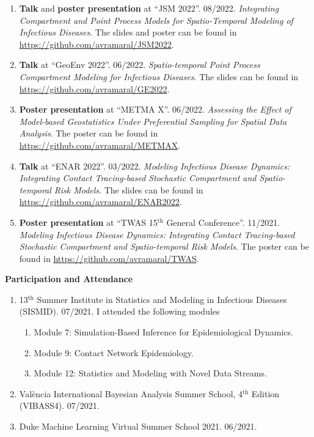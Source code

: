 \documentclass[11pt, ]{article}
\begin{document}
	\begin{enumerate}
		\item \textbf{Talk} and \textbf{poster presentation} at ``JSM 2022''. 08/2022. \textit{Integrating Compartment and Point Process Models for Spatio-Temporal Modeling of Infectious Diseases}. The slides and poster can be found in \href{https://github.com/avramaral/JSM2022}{https://github.com/avramaral/JSM2022}.
		
		\item \textbf{Talk} at ``GeoEnv 2022''. 06/2022. \textit{Spatio-temporal Point Process Compartment Modeling for Infectious Diseases}. The slides can be found in \href{https://github.com/avramaral/GE2022}{https://github.com/avramaral/GE2022}.
		
		\item \textbf{Poster presentation} at ``METMA X''. 06/2022. \textit{Assessing the Effect of Model-based Geostatistics Under Preferential Sampling for Spatial Data Analysis}. The poster can be found in \href{https://github.com/avramaral/METMAX}{https://github.com/avramaral/METMAX}.
		
		\item \textbf{Talk} at ``ENAR 2022''. 03/2022. \textit{Modeling Infectious Disease Dynamics: Integrating Contact Tracing-based	Stochastic Compartment and Spatio-temporal Risk Models}. The slides can be found in \href{https://github.com/avramaral/ENAR2022}{https://github.com/avramaral/ENAR2022}.
		
		\item \textbf{Poster presentation} at ``TWAS 15${}^{\text{th}}$ General Conference''. 11/2021. \textit{Modeling Infectious Disease Dynamics: Integrating Contact Tracing-based	Stochastic Compartment and Spatio-temporal Risk Models}. The poster can be found in \href{https://github.com/avramaral/TWAS}{https://github.com/avramaral/TWAS}.
	\end{enumerate}

{\Large \textbf{Participation and Attendance}}

\begin{enumerate}
	\item 13${}^{\text{th}}$ Summer Institute in Statistics and Modeling in Infectious Diseases (SISMID). 07/2021. I attended the following modules \vspace{-6pt}
	\begin{enumerate}[label*=\arabic*., noitemsep]
		\item Module 7: Simulation-Based Inference for Epidemiological Dynamics.
		\item Module 9: Contact Network Epidemiology.
		\item Module 12: Statistics and Modeling with Novel Data Streams.
	\end{enumerate}
	
	\item València International Bayesian Analysis Summer School, 4${}^{\text{th}}$ Edition (VIBASS4). 07/2021.
	
	\item Duke Machine Learning Virtual Summer School 2021. 06/2021.
\end{enumerate}

\vspace{6pt}
\end{document}
